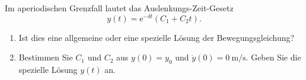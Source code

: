 \begin{ExerciseBlock}
Im aperiodischen Grenzfall lautet das Auslenkungs-Zeit-Gesetz
\[
 y(t)=\mathrm e^{-\delta t}(C_1+C_2t).
\]
\begin{enumerate}
\item Ist dies eine allgemeine oder eine spezielle Lösung der Bewegungsgleichung?
\item Bestimmen Sie $C_1$ und $C_2$ aus $y(0)=y_0$ und $\dot y(0)=\qty{0}{\metre\per\second}$. Geben Sie die spezielle Lösung $y(t)$ an.
\end{enumerate}
\end{ExerciseBlock}
